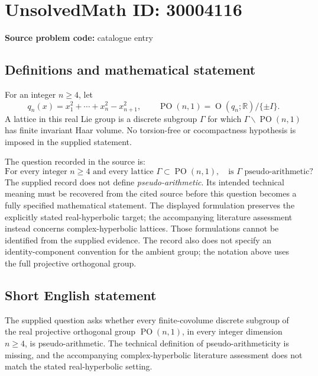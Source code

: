 \documentclass[11pt]{article}
\newcommand{\R}{\mathbb{R}}
\begin{document}
\section*{UnsolvedMath ID: 30004116}
\textbf{Source problem code:} catalogue entry
\subsection{Definitions and mathematical statement}
For an integer \(n\geq 4\), let
\[
q_n(x)=x_1^2+\cdots+x_n^2-x_{n+1}^2,
\qquad
\operatorname{PO}(n,1)=\operatorname{O}(q_n;\R)/\{\pm I\}.
\]
A lattice in this real Lie group is a discrete subgroup \(\Gamma\) for which \(\Gamma\backslash\operatorname{PO}(n,1)\) has finite invariant Haar volume. No torsion-free or cocompactness hypothesis is imposed in the supplied statement.

The question recorded in the source is:
\[
\text{For every integer }n\geq4\text{ and every lattice }
\Gamma\subset\operatorname{PO}(n,1),
\quad\text{is }\Gamma\text{ pseudo-arithmetic?}
\]
The supplied record does not define \emph{pseudo-arithmetic}. Its intended technical meaning must be recovered from the cited source before this question becomes a fully specified mathematical statement. The displayed formulation preserves the explicitly stated real-hyperbolic target; the accompanying literature assessment instead concerns complex-hyperbolic lattices. Those formulations cannot be identified from the supplied evidence. The record also does not specify an identity-component convention for the ambient group; the notation above uses the full projective orthogonal group.
\subsection{Short English statement}
The supplied question asks whether every finite-covolume discrete subgroup of the real projective orthogonal group \(\operatorname{PO}(n,1)\), in every integer dimension \(n\geq4\), is pseudo-arithmetic. The technical definition of pseudo-arithmeticity is missing, and the accompanying complex-hyperbolic literature assessment does not match the stated real-hyperbolic setting.
\end{document}

